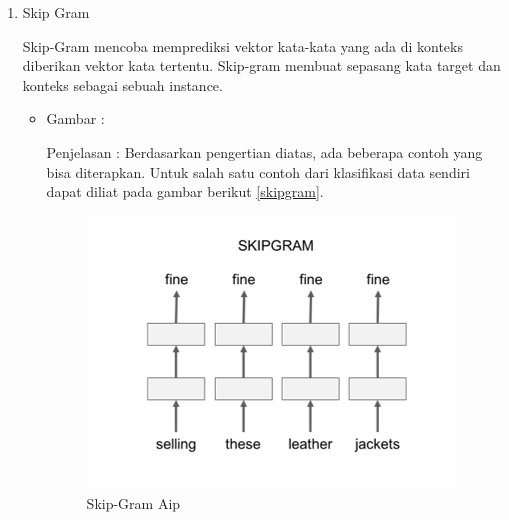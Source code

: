 \begin{enumerate}
\item Skip Gram
\par Skip-Gram mencoba memprediksi vektor kata-kata yang ada di konteks diberikan vektor kata tertentu. Skip-gram membuat sepasang kata target dan konteks sebagai sebuah instance.
\par
\begin{itemize}
\item Gambar :
\par Penjelasan : Berdasarkan pengertian diatas, ada beberapa contoh yang bisa diterapkan. Untuk salah satu contoh dari klasifikasi data sendiri dapat diliat pada gambar berikut \ref{skipgram}.
\begin{figure}
\centering
\includegraphics[scale=0.2]{figures/AIP/d6.PNG}
\caption{Skip-Gram Aip}
\label{text-Aip}
\end{figure}
\end{itemize}
\end{enumerate}

